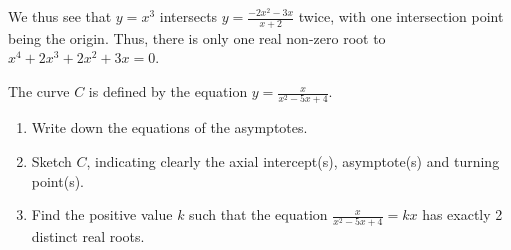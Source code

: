 \begin{solution}
\begin{ppart}
\begin{center}
        \end{center}

        We thus see that $y = x^3$ intersects $y = \frac{-2x^2-3x}{x+2}$ twice, with one intersection point being the origin. Thus, there is only one real non-zero root to $x^4 + 2x^3 + 2x^2 + 3x =0$.
    \end{ppart}
\end{solution}

\begin{problem}
    The curve $C$ is defined by the equation $y = \frac{x}{x^2-5x+4}$.

    \begin{enumerate}
        \item Write down the equations of the asymptotes.
        \item Sketch $C$, indicating clearly the axial intercept(s), asymptote(s) and turning point(s).
        \item Find the positive value $k$ such that the equation $\frac{x}{x^2-5x+4} = kx$ has exactly 2 distinct real roots.
    \end{enumerate}
\end{problem}
